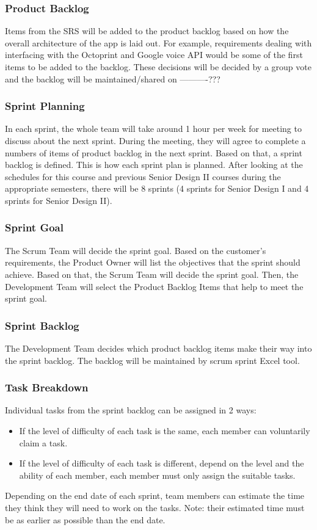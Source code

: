 \subsubsection{Product Backlog}
Items from the SRS will be added to the product backlog based on how the overall architecture of the app is laid out. For example, requirements dealing with interfacing with the Octoprint and Google voice API would be some of the first items to be added to the backlog. These decisions will be decided by a group vote and the backlog will be maintained/shared on ----------???

\subsubsection{Sprint Planning}
In each sprint, the whole team will take around 1 hour per week for meeting to discuss about the next sprint. During the meeting, they will agree to complete a numbers of items of product backlog in the next sprint. Based on that, a sprint backlog is defined. This is how each sprint plan is planned. After looking at the schedules for this course and previous Senior Design II courses during the appropriate semesters, there will be 8 sprints (4 sprints for Senior Design I and 4 sprints for Senior Design II).

\subsubsection{Sprint Goal}
The Scrum Team will decide the sprint goal. Based on the customer's requirements, the Product Owner will list the objectives that the sprint should achieve. Based on that, the Scrum Team will decide the sprint goal. Then, the Development Team will select the Product Backlog Items that help to meet the sprint goal. 

\subsubsection{Sprint Backlog}
The Development Team decides which product backlog items make their way into the sprint backlog. The backlog will be maintained by scrum sprint Excel tool.

\subsubsection{Task Breakdown}
Individual tasks from the sprint backlog can be assigned in 2 ways: 
\begin{itemize}

\item If the level of difficulty of each task is the same, each member can voluntarily claim a task.

\item If the level of difficulty of each task is different, depend on the level and the ability of each member, each member must only assign the suitable tasks.  

\end{itemize}
Depending on the end date of each sprint, team members can estimate the time they think they will need to work on the tasks. Note: their estimated time must be as earlier as possible than the end date. 

